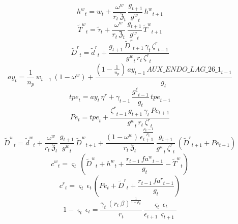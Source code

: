 \begin{dmath}
{{h^w}}_{t}={{w}}_{t}+\frac{{{\omega^w}}}{{{r}}_{t}\, {{\mathfrak{Z}}}_{t}}\, \frac{{{g}}_{t+1}}{{{g^w}}_{t}}\, {{h^w}}_{t+1}
\end{dmath}
\begin{dmath}
{{\tilde{T}^w}}_{t}={\tilde{\tau}}_{t}+\frac{{{\omega^w}}}{{{r}}_{t}\, {{\mathfrak{Z}}}_{t}}\, \frac{{{g}}_{t+1}}{{{g^w}}_{t}}\, {{\tilde{T}^w}}_{t+1}
\end{dmath}
\begin{dmath}
{\tilde{D}^r}_{t}={\tilde{d}^r}_{t}+\frac{{{g}}_{t+1}\, {\tilde{D}^r}_{t+1}\, {{\gamma}}_{t}\, {{\zeta^{r}}}_{t-1}}{{{g^w}}_{t}\, {{r}}_{t}\, {{\zeta^{r}}}_{t}}
\end{dmath}
\begin{dmath}
{{ay}}_{t}=\frac{1}{{{n_p}}}\, {{w}}_{t-1}\, \left(1-{{\omega^w}}\right)+\frac{\left(1-\frac{1}{{{n_p}}}\right)\, {{ay}}_{t-1}\, {AUX\_ENDO\_LAG\_26\_1}_{t-1}}{{{g}}_{t}}
\end{dmath}
\begin{dmath}
{{tpe}}_{t}={{ay}}_{t}\, {{\eta^r}}+{{\gamma}}_{t-1}\, \frac{{{g^{\xi}}}_{t-1}}{{{g}}_{t}}\, {{tpe}}_{t-1}
\end{dmath}
\begin{dmath}
{{Pe}}_{t}={{tpe}}_{t}+\frac{{{\zeta^{r}}}_{t-1}\, {{g}}_{t+1}\, {{\gamma}}_{t}\, {{Pe}}_{t+1}}{{{g^w}}_{t}\, {{r}}_{t}\, {{\zeta^{r}}}_{t}}
\end{dmath}
\begin{dmath}
{\tilde{D}^w}_{t}={\tilde{d}^w}_{t}+\frac{{{\omega^w}}}{{{r}}_{t}\, {{\mathfrak{Z}}}_{t}}\, \frac{{{g}}_{t+1}}{{{g^w}}_{t}}\, {\tilde{D}^w}_{t+1}+\frac{\left(1-{{\omega^w}}\right)\, {{\epsilon}}_{t+1}^{\frac{{{\rho_U}}-1}{{{\rho_U}}}}}{{{r}}_{t}\, {{\mathfrak{Z}}}_{t}}\, \frac{{{g}}_{t+1}}{{{g^w}}_{t}\, {{\zeta^{r}}}_{t}}\, \left({\tilde{D}^r}_{t+1}+{{Pe}}_{t+1}\right)
\end{dmath}
\begin{dmath}
{{c^w}}_{t}={{\varsigma}}_{t}\, \left({\tilde{D}^w}_{t}+{{h^w}}_{t}+\frac{{{r}}_{t-1}\, {{fa^w}}_{t-1}}{{{g}}_{t}}-{{\tilde{T}^w}}_{t}\right)
\end{dmath}
\begin{dmath}
{{c^r}}_{t}={{\varsigma}}_{t}\, {{\epsilon}}_{t}\, \left({{Pe}}_{t}+{\tilde{D}^r}_{t}+\frac{{{r}}_{t-1}\, {{fa^r}}_{t-1}}{{{g}}_{t}}\right)
\end{dmath}
\begin{dmath}
1-{{\varsigma}}_{t}\, {{\epsilon}}_{t}=\frac{{{\gamma}}_{t}\, \left({{r}}_{t}\, {{\beta}}\right)^{\frac{1}{1-{{\rho_U}}}}}{{{r}}_{t}}\, \frac{{{\varsigma}}_{t}\, {{\epsilon}}_{t}}{{{\epsilon}}_{t+1}\, {{\varsigma}}_{t+1}}
\end{dmath}
